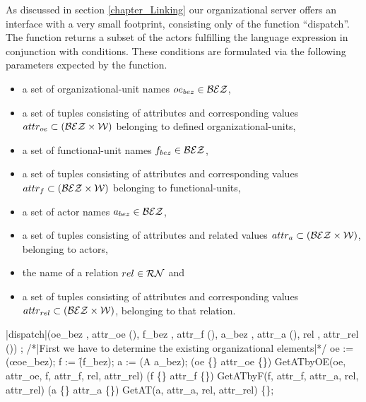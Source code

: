 As discussed in section \ref{chapter_Linking} our organizational server offers an interface with a very small footprint, consisting only of the function "`dispatch"'. The function returns a subset of the actors fulfilling the language expression in conjunction with conditions. These conditions are formulated via the following parameters expected by the function. 
\begin{itemize}
	\item a set of organizational-unit names $oe_{bez} \in \mathcal{BEZ}$,
	\item a set of tuples consisting of attributes and corresponding values $attr_{oe} \subset (\mathcal{BEZ} \times \mathcal{W})$ belonging to defined organizational-units, 
	\item a set of functional-unit names $f_{bez} \in \mathcal{BEZ}$,
	\item a set of tuples consisting of attributes and corresponding values $attr_{f} \subset (\mathcal{BEZ} \times \mathcal{W})$ belonging to functional-units,
	\item a set of actor names $a_{bez} \in \mathcal{BEZ}$,
	\item a set of tuples consisting of attributes and related values $attr_{a} \subset (\mathcal{BEZ} \times \mathcal{W})$, belonging to actors,
	\item the name of a relation $rel \in \mathcal{RN}$ and
	\item a set of tuples consisting of attributes and corresponding values $attr_{rel} \subset (\mathcal{BEZ} \times \mathcal{W})$, belonging to that relation.
\end{itemize}


	\begin{samepage}
	{\small
	\NumberProgramstrue
	\begin{algorithm}[dispatch]\label{alg:GetIt}
	\begin{program}
	\FUNCT |dispatch|(oe_{bez} \subset \Bezeichner, attr_{oe} \subset (\Bezeichner \times \WerteMenge), 
	f_{bez} \subset \Bezeichner, attr_f \subset (\Bezeichner \times \WerteMenge), 
	a_{bez} \subset \Bezeichner, attr_a \subset (\Bezeichner \times \WerteMenge), 
	rel \in \relname, attr_{rel} \subset (\Bezeichner \times \WerteMenge)) \subset \a 
	\BEGIN
	\var {};
	/*|First we have to determine the existing organizational elements|*/
	oe := (\oe \rhd oe_{bez});
	f := (\f \rhd f_{bez});
	a := (A \rhd a_{bez});
	\IF (oe \neq \{\} \vee attr_{oe} \neq \{\}) \label{alg:GetIt:CallGetATbyOE}
	\THEN \RETURN \quad GetATbyOE(oe, attr_{oe}, f, attr_f, rel, attr_{rel}) 
	\FI
	\IF (f \neq \{\} \vee attr_f \neq \{\})
	\THEN \RETURN \quad GetATbyF(f, attr_f, attr_a, rel, attr_{rel}) 
	\FI
	\IF (a \neq \{\} \vee attr_a \neq \{\})
	\THEN \RETURN \quad GetAT(a, attr_a, rel, attr_{rel})
	\FI
	\RETURN \{\};
	\END
	\end{program}
	\end{algorithm}
	\NumberProgramsfalse
	}
	\end{samepage}

